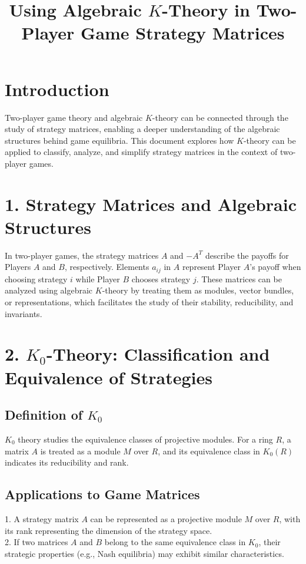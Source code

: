 \documentclass[12pt]{article}
\begin{document}
\title{Using Algebraic \( K \)-Theory in Two-Player Game Strategy Matrices}
\author{}
\date{}
\maketitle

\section*{Introduction}
Two-player game theory and algebraic \( K \)-theory can be connected through
the study of strategy matrices, 
enabling a deeper understanding of the algebraic structures 
behind game equilibria. This document explores how \( K \)-theory can be 
applied to classify, analyze, and simplify strategy matrices in the context
 of two-player games.

\section*{1. Strategy Matrices and Algebraic Structures}
In two-player games, the strategy matrices \( A \) and \( -A^T \) describe 
the payoffs for Players \( A \) and \( B \), respectively. 
Elements \( a_{ij} \) in \( A \) represent Player \( A \)'s payoff 
when choosing strategy \( i \) while Player \( B \) chooses strategy \( j \).
These matrices can be analyzed using algebraic \( K \)-theory by 
treating them as modules, vector bundles, or representations, 
which facilitates the study of their stability, reducibility, 
and invariants.

\section*{2. \( K_0 \)-Theory: Classification and Equivalence of Strategies}
\subsection*{Definition of \( K_0 \)}
\( K_0 \) theory studies the equivalence classes of projective modules. For a ring \( R \), a matrix \( A \) is treated as a module \( M \) over \( R \), and its equivalence class in \( K_0(R) \) indicates its reducibility and rank.

\subsection*{Applications to Game Matrices}
1. A strategy matrix \( A \) can be represented as a projective module 
\( M \) over \( R \), with its rank representing the dimension of
 the strategy space.\\
2. If two matrices \( A \) and \( B \) belong to the same equivalence class
 in \( K_0 \), their strategic properties (e.g., Nash equilibria) may
  exhibit similar characteristics.
\end{document}
